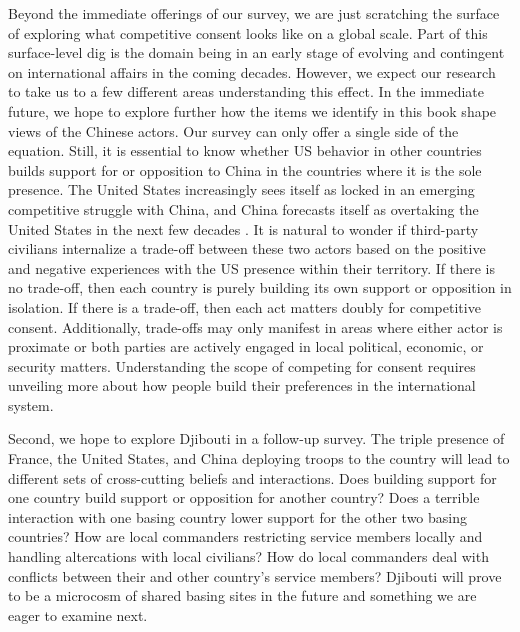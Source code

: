 Beyond the immediate offerings of our survey, we are just scratching the surface of exploring what competitive consent looks like on a global scale. Part of this surface-level dig is the domain being in an early stage of evolving and contingent on international affairs in the coming decades. However, we expect our research to take us to a few different areas understanding this effect. In the immediate future, we hope to explore further how the items we identify in this book shape views of the Chinese actors. Our survey can only offer a single side of the equation. Still, it is essential to know whether US behavior in other countries builds support for or opposition to China in the countries where it is the sole presence. The United States increasingly sees itself as locked in an emerging competitive struggle with China, and China forecasts itself as overtaking the United States in the next few decades \cite{Doshi2021}. It is natural to wonder if third-party civilians internalize a trade-off between these two actors based on the positive and negative experiences with the US presence within their territory. If there is no trade-off, then each country is purely building its own support or opposition in isolation. If there is a trade-off, then each act matters doubly for competitive consent. Additionally, trade-offs may only manifest in areas where either actor is proximate or both parties are actively engaged in local political, economic, or security matters. Understanding the scope of competing for consent requires unveiling more about how people build their preferences in the international system.

Second, we hope to explore Djibouti in a follow-up survey. The triple presence of France, the United States, and China deploying troops to the country will lead to different sets of cross-cutting beliefs and interactions. Does building support for one country build support or opposition for another country? Does a terrible interaction with one basing country lower support for the other two basing countries? How are local commanders restricting service members locally and handling altercations with local civilians? How do local commanders deal with conflicts between their and other country's service members? Djibouti will prove to be a microcosm of shared basing sites in the future and something we are eager to examine next. %

